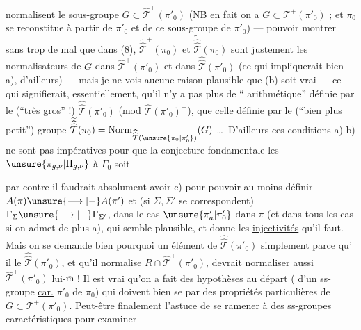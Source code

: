 \uline{normalisent} le sous-groupe $G\subset\widehat{\mathcal T}^{+}(\pi'_0)$
(\uline{NB} en fait on a $G\subset\mathcal T^{+}(\pi'_0)$ ;  et $\pi_0$
se reconstitue à partir de $\pi'_0$ et de
ce sous-groupe de $\pi'_0$) --- 
pouvoir montrer sans trop de mal
que  dans (8), $\widetilde{\widehat{\mathcal T}}^{+}(\pi_0)$ et $\widetilde{\widehat{\widehat{\mathcal T}}}(\pi_0)$
sont justement les normalisateurs de $G$
dans $\widehat{\mathcal T}^{+}(\pi'_0)$ et dans $\widehat{\widehat{\mathcal T}}(\pi'_0)$ (ce
qui impliquerait bien a), d'ailleurs) ---
mais je ne vois aucune raison plausible
que (b) soit vrai --- ce qui signifierait,
essentiellement, qu'il n'y a pas plus de
`` arithmétique'' définie par le
(``très gros'' !) $\widehat{\widehat{\mathcal T}}(\pi'_0)$ (mod $\widehat{\mathcal T}(\pi'_0)^{+}$), que
celle définie par le (``bien plus petit'') groupe
$\widetilde{\widehat{\widehat{\mathcal T}}}(\pi_0)=\operatorname{Norm}_{\widehat{\widehat{\mathcal T}}(\unsure{\pi_0|\pi'_0})}(G)$ \dots\ D'ailleurs ces
conditions a) b) ne sont pas impératives
pour que la conjecture fondamentale
 les $\unsure{\pi_{g,\nu}|\Pi_{g,\nu}}$ à $\Gamma_0$ soit  ---

par contre il faudrait absolument avoir
c) pour pouvoir au moins définir
$A(\pi)\unsure{\longrightarrow|{-}}A(\pi')$ et (si $\Sigma,\Sigma'$ se correspondent)
$\Gamma_{\Sigma}\unsure{\longrightarrow|{-}}\Gamma_{\Sigma'}$, dans le cas $\unsure{\pi'_a|\pi'_0}$  dans $\pi$
(et dans tous les cas si on admet de plus
a), qui semble  plausible, et donne
les \uline{injectivités} qu'il faut. Mais on
se demande bien pourquoi un élément
de  $\widehat{\widehat{\mathcal T}}(\pi'_0)$ simplement parce qu'
il  le 
 $\widehat{\widehat{\mathcal T}}(\pi'_0)$,  et qu'il normalise
$R\cap\widehat{\mathcal T}^{+}(\pi'_0)$, devrait normaliser aussi
$\widehat{\mathcal T}^{+}(\pi'_0)$ lui-$\overline{\mathrm m}$ ! Il est vrai qu'on a
fait des hypothèses  au départ
( d'un ss-groupe \uline{car.} $\pi'_0$ de $\pi_0$) qui
doivent bien se  par des propriétés
particulières de $G\subset\mathcal T^{+}(\pi'_0)$. Peut-être
finalement l'astuce de se ramener à des
ss-groupes caractéristiques pour examiner

